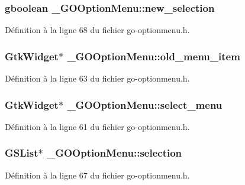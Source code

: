 \subsubsection[{new\_\-selection}]{\setlength{\rightskip}{0pt plus 5cm}gboolean {\bf \_\-GOOptionMenu::new\_\-selection}}\label{struct__GOOptionMenu_a7d2136dee70ebf2070a990a856534467}


Définition à la ligne 68 du fichier go-\/optionmenu.h.

\subsubsection[{old\_\-menu\_\-item}]{\setlength{\rightskip}{0pt plus 5cm}GtkWidget$\ast$ {\bf \_\-GOOptionMenu::old\_\-menu\_\-item}}\label{struct__GOOptionMenu_a5df201adc46f9f144da31ae5f734b4ee}


Définition à la ligne 63 du fichier go-\/optionmenu.h.

\subsubsection[{select\_\-menu}]{\setlength{\rightskip}{0pt plus 5cm}GtkWidget$\ast$ {\bf \_\-GOOptionMenu::select\_\-menu}}\label{struct__GOOptionMenu_a5d9a576e5d891231d25d65951bd9213c}


Définition à la ligne 61 du fichier go-\/optionmenu.h.

\subsubsection[{selection}]{\setlength{\rightskip}{0pt plus 5cm}GSList$\ast$ {\bf \_\-GOOptionMenu::selection}}\label{struct__GOOptionMenu_ad40624ee6d30e4a64a740da43a456d29}


Définition à la ligne 67 du fichier go-\/optionmenu.h.

